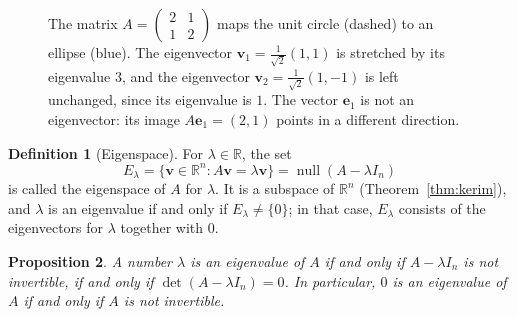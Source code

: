 \documentclass[11pt]{article}
\theoremstyle{definition}
\newtheorem{definition}{Definition}[section]
\theoremstyle{plain}
\newtheorem{proposition}[definition]{Proposition}
\theoremstyle{remark}
\DeclareMathOperator{\Null}{null}
\begin{document}
\begin{figure}[ht]
    \centering
    \caption[Eigenvectors]{The matrix $A = \begin{pmatrix} 2 & 1 \\ 1 & 2 \end{pmatrix}$ maps the unit circle (dashed) to an ellipse (blue). The eigenvector $\mathbf{v}_1 = \frac{1}{\sqrt{2}}(1, 1)$ is stretched by its eigenvalue $3$, and the eigenvector $\mathbf{v}_2 = \frac{1}{\sqrt{2}}(1, -1)$ is left unchanged, since its eigenvalue is $1$. The vector $\mathbf{e}_1$ is not an eigenvector: its image $A\mathbf{e}_1 = (2, 1)$ points in a different direction.}
    \label{fig:eigen}
\end{figure}

\begin{definition}[Eigenspace]
    For $\lambda \in \mathbb{R}$, the set
    \[E_\lambda = \{\mathbf{v} \in \mathbb{R}^n : A\mathbf{v} = \lambda \mathbf{v}\} = \Null(A - \lambda I_n)\]
    is called the eigenspace of $A$ for $\lambda$. It is a subspace of $\mathbb{R}^n$ (Theorem~\ref{thm:kerim}), and $\lambda$ is an eigenvalue if and only if $E_\lambda \neq \{0\}$; in that case, $E_\lambda$ consists of the eigenvectors for $\lambda$ together with $0$.
\end{definition}

\begin{proposition}\label{prop:eigen-det}
    A number $\lambda$ is an eigenvalue of $A$ if and only if $A - \lambda I_n$ is not invertible, if and only if $\det(A - \lambda I_n) = 0$. In particular, $0$ is an eigenvalue of $A$ if and only if $A$ is not invertible.
\end{proposition}
\end{document}
